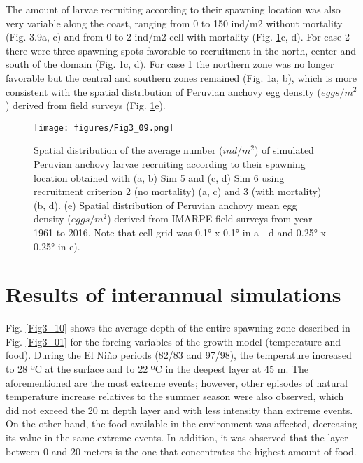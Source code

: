 The amount of larvae recruiting according to their spawning location was also very variable along the coast, ranging from 0 to 150 ind/m2 without mortality (Fig. 3.9a, c) and from 0 to 2 ind/m2 cell with mortality (Fig. \ref{Fig3_09}c, d).  For case 2 there were three spawning spots favorable to recruitment in the north, center and south of the domain (Fig. \ref{Fig3_09}c, d). For case 1 the northern zone was no longer favorable but the central and southern zones remained (Fig. \ref{Fig3_09}a, b), which is more consistent with the spatial distribution of Peruvian anchovy egg density ($eggs/m^2$) derived from field surveys (Fig. \ref{Fig3_09}e).\\

\begin{figure}[ht]
	\texttt{[image: figures/Fig3\_09.png]}
	\centering
	\caption{Spatial distribution of the average number ($ind/m^2$) of simulated Peruvian anchovy larvae recruiting according to their spawning location obtained with (a, b) Sim 5 and (c, d) Sim 6 using recruitment criterion 2 (no mortality) (a, c) and 3 (with mortality) (b, d). (e) Spatial distribution of Peruvian anchovy mean egg density ($eggs/m^2$) derived from IMARPE field surveys from year 1961 to 2016. Note that cell grid was 0.1° x 0.1° in a - d and 0.25° x 0.25° in e).}
	\label{Fig3_09}
\end{figure}

\section{Results of interannual simulations}\label{Chap3Resu2}

Fig. \ref{Fig3_10} shows the average depth of the entire spawning zone described in Fig. \ref{Fig3_01} for the forcing variables of the growth model (temperature and food). During the El Niño periods (82/83 and 97/98), the temperature increased to 28 ºC at the surface and to 22 ºC in the deepest layer at 45 m. The aforementioned are the most extreme events; however, other episodes of natural temperature increase relatives to the summer season were also observed, which did not exceed the 20 m depth layer and with less intensity than extreme events. On the other hand, the food available in the environment was affected, decreasing its value in the same extreme events. In addition, it was observed that the layer between 0 and 20 meters is the one that concentrates the highest amount of food.\\


